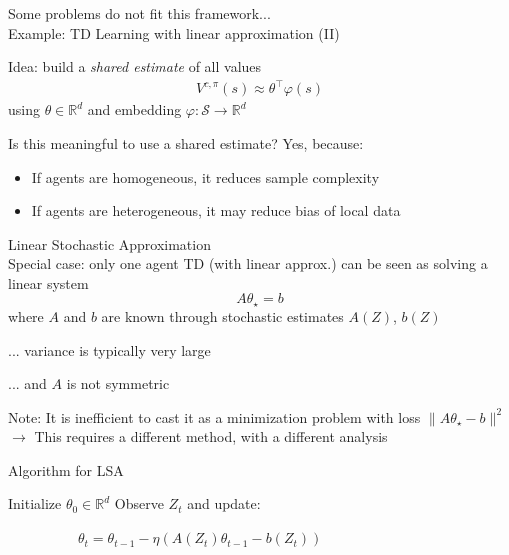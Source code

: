 \documentclass[aspectratio=169,14pt]{beamer}
\begin{document}
\begin{frame}{Some problems do not fit this framework...\\[-0.5em]
    \large Example: TD Learning with linear approximation (II)}

  Idea: build a \emph{shared estimate} of all values
  \begin{align*}
    V^{c,\pi}(s) \approx \theta^\top \varphi(s)
  \end{align*}
  using $\theta \in \mathbb{R}^d$ and embedding $\varphi: \mathcal{S} \rightarrow \mathbb{R}^d$

  \vspace{1em}
  
  \pause

  Is this meaningful to use a shared estimate? Yes, because:
  \begin{itemize}
  \item If agents are homogeneous, it reduces sample complexity
  \item If agents are heterogeneous, it may reduce bias of local data
  \end{itemize}
\end{frame}


\begin{frame}{Linear Stochastic Approximation\\[-0.5em]
  \normalsize Special case: only one agent}
  TD (with linear approx.) can be seen as solving a linear system 
  \begin{equation*}
    A \theta_\star
    = 
    b
  \end{equation*}
  where $A$ and $b$ are known through stochastic estimates $A(Z)$, $b(Z)$

  ... variance is typically very large

  \vspace{-0.5em}
  
  ... and $A$ is not symmetric
  
  \vspace{1em}

  \pause

  \small 
  Note: It is inefficient to cast it as a minimization problem with loss $\| A \theta_\star - b \|^2$\\
  $\rightarrow$ This requires a different method, with a different analysis
\end{frame}

\begin{frame}{Algorithm for LSA}
  \begin{algorithmic}
    \State Initialize $\theta_0 \in \mathbb{R}^d$
    \State Observe $Z_{t}$ and update:
    \begin{center}
      ~~~~~~~~~~$\theta_{t} = \theta_{t-1} - \eta( A(Z_{t}) \theta_{t-1} - b(Z_{t}))$
    \end{center}
    \EndFor
  \end{algorithmic}  
  
\end{frame}
\end{document}
